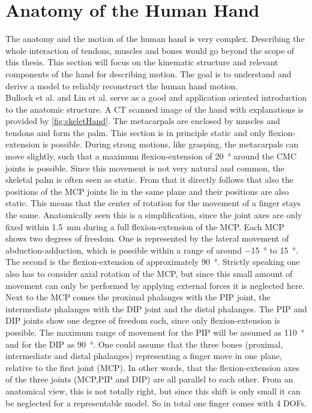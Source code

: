 \section{Anatomy of the Human Hand} \label{sec:anatomy}
The anatomy and the motion of the human hand is very complex. Describing the whole interaction of tendons, muscles and bones would go beyond the scope of this thesis. This section will focus on the kinematic structure and relevant components of the hand for describing motion. The goal is to understand and derive a model to reliably reconstruct the human hand motion.\\
Bullock et al. \cite{bullock2012assessing} and Lin et al. \cite{lin2000modeling} serve as a good and application oriented introduction to the anatomic structure. A \ac{CT} scanned image of the hand with explanations is provided by \ref{fig:skeletHand}. The metacarpals are enclosed by muscles and tendons and form the palm. This section is in principle static and only flexion-extension is possible. During strong motions, like grasping, the metacarpals can move slightly, such that a maximum flexion-extension of \SI{20}{\degree} around the \ac{CMC} joints is possible. Since this movement is not very natural and common, the skeletal palm is often seen as static. From that it directly follows that also the positions of the \ac{MCP} joints lie in the same plane and their positions are also static. This means that the center of rotation for the movement of a finger stays the same. Anatomically seen this is a simplification, since the joint axes are only fixed within \SI{1.5}{mm} during a full flexion-extension of the \ac{MCP}. 
Each \ac{MCP} shows two degrees of freedom. One is represented by the lateral movement of abduction-adduction, which is possible within a range of around \SI{-15}{\degree} to \SI{+15}{\degree}. The second is the flexion-extension of approximately \SI{90}{\degree}. Strictly speaking one also has to consider axial rotation of the MCP, but since this small amount of movement can only be performed by applying external forces it is neglected here. Next to the \ac{MCP} comes the proximal phalanges with the \ac{PIP} joint, the intermediate phalanges with the \ac{DIP} joint and the distal phalanges. The \ac{PIP} and \ac{DIP} joints show one degree of freedom each, since only flexion-extension is possible. The maximum range of movement for the \ac{PIP} will be assumed as \SI{110}{\degree} and for the \ac{DIP} as \SI{90}{\degree}. One could assume that the three bones (proximal, intermediate and distal phalanges) representing a finger move in one plane, relative to the first joint (\ac{MCP}). In other words, that the flexion-extension axes of the three joints (\ac{MCP},\ac{PIP} and \ac{DIP}) are all parallel to each other. From an anatomical view, this is not totally right, but since this shift is only small it can be neglected for a representable model. So in total one finger comes with 4 \acp{DOF}. 

